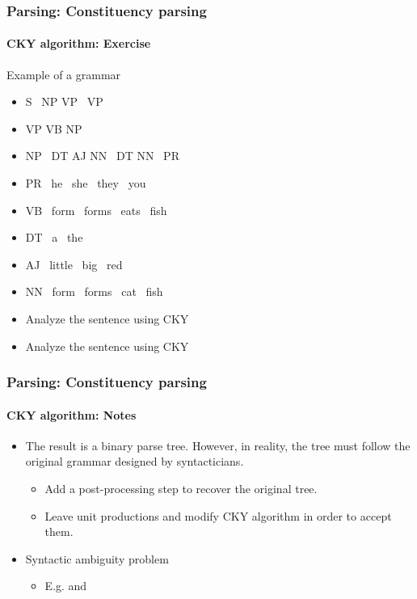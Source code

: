 \documentclass[xcolor=table]{beamer}
\begin{document}
\begin{frame}
\frametitle{Parsing: Constituency parsing}
\framesubtitle{CKY algorithm: Exercise}

\begin{exampleblock}{Example of a grammar}
	\begin{itemize}
		\item S \textrightarrow\ NP VP \textbar\ VP
		\item VP \textrightarrow VB NP
		\item NP \textrightarrow\ DT AJ NN \textbar\ DT NN \textbar\ PR 
		\item PR \textrightarrow\ he \textbar\ she \textbar\ they \textbar\ you
		\item VB \textrightarrow\ form \textbar\ forms \textbar\ eats \textbar\ fish
		\item DT \textrightarrow\ a \textbar\ the
		\item AJ \textrightarrow\ little \textbar\ big \textbar\ red 
		\item NN \textrightarrow\ form \textbar\ forms \textbar\ cat \textbar\ fish
	\end{itemize}
\end{exampleblock}\vspace{-6pt}

\begin{itemize}
	\item Analyze the sentence  using CKY 
	\item Analyze the sentence  using CKY
\end{itemize}

\end{frame}

\begin{frame}
\frametitle{Parsing: Constituency parsing}
\framesubtitle{CKY algorithm: Notes}

\begin{minipage}{.53\textwidth}
\begin{itemize}
	\item The result is a binary parse tree. 
	However, in reality, the tree must follow the original grammar designed by syntacticians.
	\begin{itemize}
		\item Add a post-processing step to recover the original tree.
		\item Leave unit productions and modify CKY algorithm in order to accept them.
	\end{itemize}
	\item Syntactic ambiguity problem
	\begin{itemize}
		\item E.g.  and 
	\end{itemize}
\end{itemize}
\end{minipage}
\begin{minipage}{.45\textwidth}
\end{minipage}

\end{frame}
\end{document}
